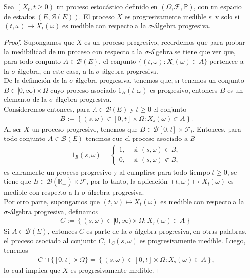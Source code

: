 \begin{proposition}
	Sea $(X_t, t \geq 0)$ un proceso estocástico definido en $(\Omega, \mathcal{F}, \mathbb{P})$, con un espacio de estados $(E, \mathcal{B}(E))$. El proceso $X$ es progresivamente medible si y solo si $(t, \omega) \rightarrow X_t(\omega)$ es medible con respecto a la $\sigma$-álgebra progresiva.
\end{proposition}
\begin{proof}
	Supongamos que $X$ es un proceso progresivo, recordemos que para probar la medibilidad de un proceso con respecto a la $\sigma$-álgebra se tiene que ver que, para todo conjunto $A \in \mathcal{B}(E)$, el conjunto $\{ (t, \omega) : X_t(\omega) \in A \}$ pertenece a la $\sigma$-álgebra, en este caso, a la $\sigma$-álgebra progresiva. \\
    
    De la definición de la $\sigma$-álgebra progresiva, tenemos que, si tenemos un conjunto $B \in [0, \infty) \times \Omega$ cuyo proceso asociado $1_B (t, \omega)$ es progresivo, entonces $B$ es un elemento de la $\sigma$-álgebra progresiva. \\
    
    Consideremos entonces, para $A \in \mathcal{B}(E)$ y $t \geq 0$ el conjunto
    \begin{align*}
		B := \left\{ (s, \omega) \in [0, t] \times \Omega : X_s(\omega) \in A \right\}.
	\end{align*}
    Al ser $X$ un proceso progresivo, tenemos que $B \in \mathcal{B}[0, t] \times \mathcal{F}_t$. Entonces, para todo conjunto $A \in \mathcal{B}(E)$ tenemos que el proceso asociado a $B$
    \begin{align*}
		1_B (s, \omega) = 
        \begin{cases}
		1, & \text{ si } (s, \omega) \in B, \\
		0, & \text{ si } (s, \omega) \notin B,
		\end{cases}
	\end{align*}
    es claramente un proceso progresivo y al cumplirse para todo tiempo $t \geq 0$, se tiene que $B \in \mathcal{B}(\mathbb{R}_{+}) \times \mathcal{F}$, por lo tanto, la aplicación $(t, \omega) \mapsto X_t (\omega)$ es medible con respecto a la $\sigma$-álgebra progresiva. \\
    
    Por otro parte, supongamos que $(t, \omega) \mapsto X_t (\omega)$ es medible con respecto a la $\sigma$-álgebra progresiva, definamos
    \begin{align*}
	C := \left\{ (s, \omega) \in [0, \infty) \times \Omega : X_s(\omega) \in A \right\}.
	\end{align*}
    Si $A \in \mathcal{B}(E)$, entonces $C$ es parte de la $\sigma$-álgebra progresiva, en otras palabras, el proceso asociado al conjunto $C$, $1_C (s, \omega)$ es progresivamente medible. Luego, tenemos
    \begin{align*}
	C \cap \{ [0, t] \times \Omega \} = \left\{ (s, \omega) \in [0, t] \times \Omega : X_s(\omega) \in A \right\},
	\end{align*}
    lo cual implica que $X$ es progresivamente medible.
\end{proof}

